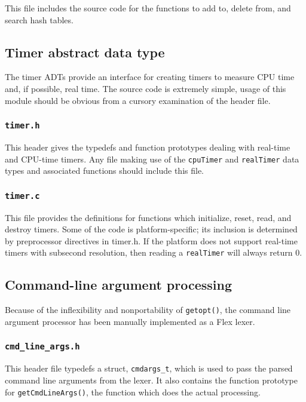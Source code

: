 \documentclass[a4paper,10pt,twocolumn]{article}
\begin{document}
This file includes the source code for the functions to add to, delete
from, and search hash tables.

\subsection{Timer abstract data type}

The timer ADTs provide an interface for creating timers to measure CPU
time and, if possible, real time. The source code is extremely simple,
usage of this module should be obvious from a cursory examination of
the header file.


\subsubsection{\texttt{timer.h}}
  
This header gives the typedefs and function prototypes dealing with
real-time and CPU-time timers. Any file making use of the
\texttt{cpuTimer} and \texttt{realTimer} data types and associated
functions should include this file.
  
\subsubsection{\texttt{timer.c}}
  
This file provides the definitions for functions which initialize,
reset, read, and destroy timers. Some of the code is
platform-specific; its inclusion is determined by preprocessor
directives in timer.h. If the platform does not support real-time
timers with subsecond resolution, then reading a \texttt{realTimer}
will always return 0.

\subsection{Command-line argument processing}

Because of the inflexibility and nonportability of \texttt{getopt()},
the command line argument processor has been manually implemented as a
Flex lexer.

\subsubsection{\texttt{cmd\_line\_args.h}}
  
This header file typedefs a struct, \texttt{cmdargs\_t}, which is used
to pass the parsed command line arguments from the lexer. It also
contains the function prototype for \texttt{getCmdLineArgs()}, the
function which does the actual processing.
\end{document}
